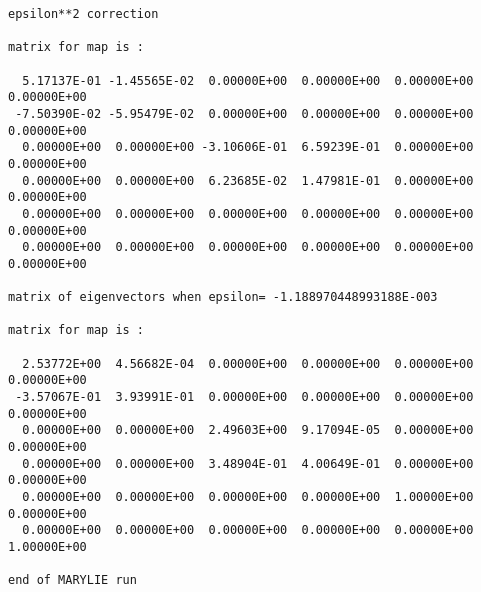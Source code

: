\begin{footnotesize}
\begin{verbatim}
epsilon**2 correction

matrix for map is :

  5.17137E-01 -1.45565E-02  0.00000E+00  0.00000E+00  0.00000E+00  0.00000E+00
 -7.50390E-02 -5.95479E-02  0.00000E+00  0.00000E+00  0.00000E+00  0.00000E+00
  0.00000E+00  0.00000E+00 -3.10606E-01  6.59239E-01  0.00000E+00  0.00000E+00
  0.00000E+00  0.00000E+00  6.23685E-02  1.47981E-01  0.00000E+00  0.00000E+00
  0.00000E+00  0.00000E+00  0.00000E+00  0.00000E+00  0.00000E+00  0.00000E+00
  0.00000E+00  0.00000E+00  0.00000E+00  0.00000E+00  0.00000E+00  0.00000E+00

matrix of eigenvectors when epsilon= -1.188970448993188E-003

matrix for map is :

  2.53772E+00  4.56682E-04  0.00000E+00  0.00000E+00  0.00000E+00  0.00000E+00
 -3.57067E-01  3.93991E-01  0.00000E+00  0.00000E+00  0.00000E+00  0.00000E+00
  0.00000E+00  0.00000E+00  2.49603E+00  9.17094E-05  0.00000E+00  0.00000E+00
  0.00000E+00  0.00000E+00  3.48904E-01  4.00649E-01  0.00000E+00  0.00000E+00
  0.00000E+00  0.00000E+00  0.00000E+00  0.00000E+00  1.00000E+00  0.00000E+00
  0.00000E+00  0.00000E+00  0.00000E+00  0.00000E+00  0.00000E+00  1.00000E+00

end of MARYLIE run

\end{verbatim}
\end{footnotesize}

\newpage
